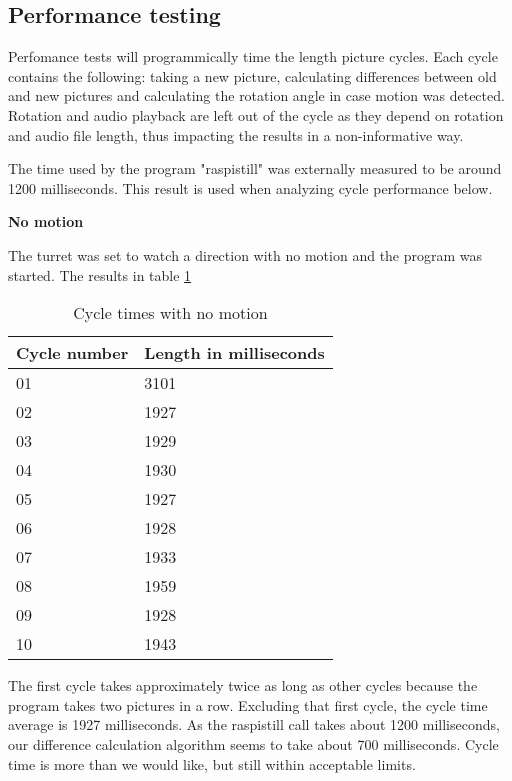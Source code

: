 \documentclass[english,11pt,twoside,a4paper]{article}
\begin{document}
\subsection{Performance testing}

Perfomance tests will programmically time the length picture cycles. Each cycle contains the following: taking a new picture, calculating differences between old and new pictures and calculating the rotation angle in case motion was detected. Rotation and audio playback are left out of the cycle as they depend on rotation and audio file length, thus impacting the results in a non-informative way.

The time used by the program "raspistill" was externally measured to be around 1200 milliseconds. This result is used when analyzing cycle performance below.

\textbf{No motion}

The turret was set to watch a direction with no motion and the program was started. The results in table \ref{cycle_times_no_motion}

\begin{table}[ht]
  \begin{center}
    \begin{tabular}{| l | l |}
      \hline
      Cycle number & Length in milliseconds \\ \hline
      01 & 3101 \\ \hline
      02 & 1927 \\ \hline
      03 & 1929 \\ \hline
      04 & 1930 \\ \hline
      05 & 1927 \\ \hline
      06 & 1928 \\ \hline
      07 & 1933 \\ \hline
      08 & 1959 \\ \hline
      09 & 1928 \\ \hline
      10 & 1943 \\ \hline
    \end{tabular}
    \caption{Cycle times with no motion}
  \end{center}
  \label{cycle_times_no_motion}
\end{table}

The first cycle takes approximately twice as long as other cycles because the program takes two pictures in a row. Excluding that first cycle, the cycle time average is 1927 milliseconds. As the raspistill call takes about 1200 milliseconds, our difference calculation algorithm seems to take about 700 milliseconds. Cycle time is more than we would like, but still within acceptable limits.
\end{document}

